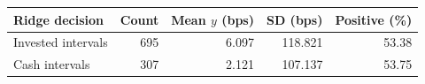 \begin{tabular}{lrrrr}
\toprule
Ridge decision & Count & Mean $y$ (bps) & SD (bps) & Positive (\%) \\
\midrule
Invested intervals & 695 & 6.097 & 118.821 & 53.38 \\
Cash intervals & 307 & 2.121 & 107.137 & 53.75 \\
\bottomrule
\end{tabular}
